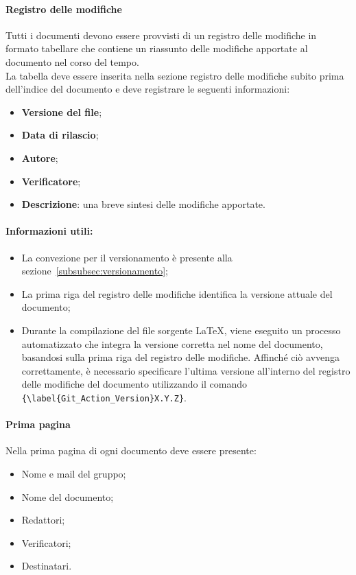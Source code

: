 \paragraph{Registro delle modifiche}
\label{sec:RegistroModifiche}
Tutti i documenti devono essere provvisti di un registro delle modifiche in formato tabellare che contiene un riassunto
delle modifiche apportate al documento nel corso del tempo. \\
La tabella deve essere inserita nella sezione registro delle modifiche subito prima dell’indice del documento e deve registrare le seguenti informazioni:
\begin{itemize}
    \item \textbf{Versione del file};
    \item \textbf{Data di rilascio};
    \item \textbf{Autore};
    \item \textbf{Verificatore};
    \item \textbf{Descrizione}: una breve sintesi delle modifiche apportate.
\end{itemize}

\hypertarget{par:infoUtiliRegistroMod}{\paragraph*{Informazioni utili:}}
\begin{itemize}
    \item La convezione per il versionamento è presente alla sezione~\ref{subsubsec:versionamento};
    \item La prima riga del registro delle modifiche identifica la versione attuale del documento;
    \item Durante la compilazione del file sorgente \LaTeX, viene eseguito un processo automatizzato che integra la versione corretta nel nome del documento, basandosi sulla prima riga del registro delle modifiche. Affinché ciò avvenga correttamente, è necessario specificare l'ultima versione all'interno del registro delle modifiche del documento utilizzando il comando \verb|{\label{Git_Action_Version}X.Y.Z}|.
\end{itemize}

\paragraph{Prima pagina}
Nella prima pagina di ogni documento deve essere presente:
\begin{itemize}
    \item Nome e mail del gruppo;
    \item Nome del documento;
    \item Redattori;
    \item Verificatori;
    \item Destinatari.
\end{itemize}

